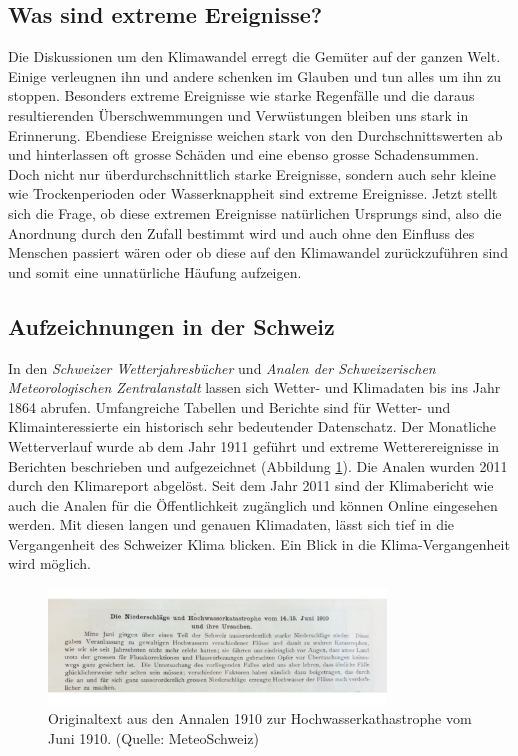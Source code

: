 \begin{refsection}
\section{Was sind extreme Ereignisse?}
Die Diskussionen um den Klimawandel erregt die Gemüter auf der ganzen Welt. Einige verleugnen ihn und andere schenken im Glauben und tun alles um ihn zu stoppen. Besonders extreme Ereignisse wie starke Regenfälle und die daraus resultierenden Überschwemmungen und Verwüstungen bleiben uns stark in Erinnerung.
Ebendiese Ereignisse weichen stark von den Durchschnittswerten ab und hinterlassen oft grosse Schäden und eine ebenso grosse Schadensummen. Doch nicht nur überdurchschnittlich starke Ereignisse, sondern auch sehr kleine wie Trockenperioden oder Wasserknappheit sind extreme Ereignisse.
Jetzt stellt sich die Frage, ob diese extremen Ereignisse natürlichen Ursprungs sind, also  die Anordnung durch den Zufall bestimmt wird und auch ohne den Einfluss des Menschen passiert wären oder ob diese auf den Klimawandel zurückzuführen sind und somit eine unnatürliche Häufung aufzeigen.


\subsection{Aufzeichnungen in der Schweiz}
In den \textit{Schweizer Wetterjahresbücher} und \textit{Analen der Schweizerischen Meteorologischen Zentralanstalt} lassen sich Wetter- und Klimadaten bis ins Jahr 1864 abrufen. Umfangreiche Tabellen und Berichte sind für Wetter- und Klimainteressierte ein historisch sehr bedeutender Datenschatz. 
Der Monatliche Wetterverlauf wurde ab dem Jahr 1911 geführt und  extreme Wetterereignisse in Berichten beschrieben und aufgezeichnet (Abbildung \ref{Analen}). Die Analen wurden 2011 durch den Klimareport abgelöst. Seit dem Jahr 2011 sind der Klimabericht wie auch die Analen für die Öffentlichkeit zugänglich und können Online eingesehen werden.
Mit diesen langen und genauen Klimadaten, lässt sich tief in die Vergangenheit des Schweizer Klima blicken. Ein Blick in die Klima-Vergangenheit wird möglich.

\begin{figure}[htbp]
\centering
\includegraphics[width=0.8\textwidth]{extrem/Analen.jpg}
\caption{Originaltext aus den Annalen 1910 zur Hochwasserkathastrophe vom Juni 1910. (Quelle: MeteoSchweiz)}
\label{Analen}
\end{figure}



\end{refsection}
